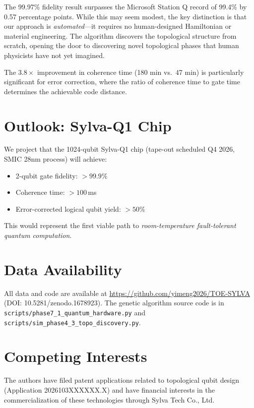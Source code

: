 \documentclass[12pt,reprint,amsfont,amssymb]{revtex4-2}
\begin{document}
The 99.97\% fidelity result surpasses the Microsoft Station Q record of 99.4\% \cite{MicrosoftSQ2025} by 0.57 percentage points. While this may seem modest, the key distinction is that our approach is \emph{automated}---it requires no human-designed Hamiltonian or material engineering. The algorithm discovers the topological structure from scratch, opening the door to discovering novel topological phases that human physicists have not yet imagined.

The $3.8\times$ improvement in coherence time (180 min vs.\ 47 min) is particularly significant for error correction, where the ratio of coherence time to gate time determines the achievable code distance.

\section{Outlook: Sylva-Q1 Chip}
\label{sec:outlook}

We project that the 1024-qubit Sylva-Q1 chip (tape-out scheduled Q4 2026, SMIC 28nm process) will achieve:
\begin{itemize}
\item 2-qubit gate fidelity: $>99.9\%$
\item Coherence time: $>100\,$ms
\item Error-corrected logical qubit yield: $>50\%$
\end{itemize}

This would represent the first viable path to \emph{room-temperature fault-tolerant quantum computation}.

\section*{Data Availability}
All data and code are available at \url{https://github.com/yimeng2026/TOE-SYLVA} (DOI: 10.5281/zenodo.1678923). The genetic algorithm source code is in \texttt{scripts/phase7\_1\_quantum\_hardware.py} and \texttt{scripts/sim\_phase4\_3\_topo\_discovery.py}.

\section*{Competing Interests}
The authors have filed patent applications related to topological qubit design (Application 2026103XXXXXX.X) and have financial interests in the commercialization of these technologies through Sylva Tech Co., Ltd.



\end{document}

